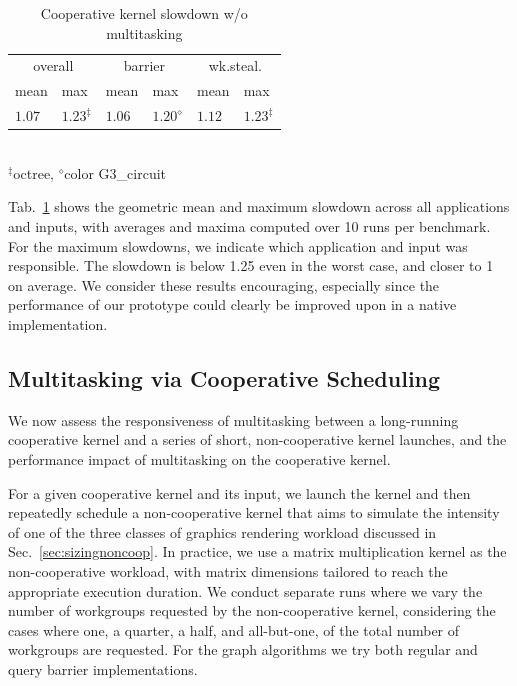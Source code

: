 \documentclass[sigconf]{acmart}
\newcommand{\mytab}{Tab.~}
\newcommand{\mysec}{Sec.~}
\begin{document}
{\begin{table}
\normalsize
\centering
\begin{tabular}{ l l | l l | l l }
\multicolumn{2}{c|}{overall} & \multicolumn{2}{c|}{barrier} & \multicolumn{2}{c}{wk.steal.} \\
mean & max & mean & max & mean & max \\
\hline
$1.07$ & $1.23^{\ddagger}$ & $1.06$ & $1.20^{\diamond}$ & $1.12$ & $1.23^{\ddagger}$ \\
\end{tabular}\\
{\small
 $^{\ddagger}$octree, $^{\diamond}$color G3\_circuit
}
\caption{Cooperative kernel slowdown w/o multitasking}
\label{tab:overhead}
\end{table}



\mytab\ref{tab:overhead} shows the geometric mean and
maximum slowdown across all applications and inputs, with averages and
maxima computed over 10 runs per benchmark. For the maximum slowdowns,
we indicate which application and input was responsible. The slowdown is
below 1.25 even in the worst case, and closer to 1 on average. We consider
these results encouraging, especially since the performance of our
prototype could clearly be improved upon in a native implementation.


\subsection{Multitasking via Cooperative Scheduling}\label{sec:responsiveness}

We now assess the responsiveness of multitasking between a
long-running cooperative kernel and a series of short, non-cooperative
kernel launches, and the performance impact of multitasking on the
cooperative kernel.


 For a given cooperative kernel and
its input, we launch the kernel and then repeatedly schedule a
non-cooperative kernel that aims to simulate the intensity of one of
the three classes of graphics rendering workload discussed in
\mysec\ref{sec:sizingnoncoop}. In practice, we use a matrix
multiplication kernel as the non-cooperative workload, with matrix
dimensions tailored to reach the appropriate execution duration.  We
conduct separate runs where we vary the number of workgroups requested
by the non-cooperative kernel, considering the cases where one, a
quarter, a half, and all-but-one, of the total number of workgroups
are requested. For the graph algorithms we try both
regular and query barrier implementations.

}
\end{document}
